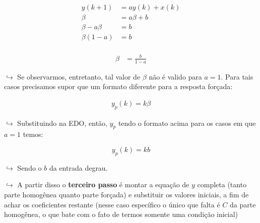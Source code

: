 \documentclass[]{article}
\begin{document}
  \[
  \begin{aligned}
  y(k+1) &= ay(k) + x(k) \\ 
  \beta &= a \beta + b  \\ 
  \beta - a \beta &= b \\ 
  \beta(1 - a) &= b \\ 
  \end{aligned}
  \]

  \[
  \begin{align}
  \beta&= \frac{b}{1-a}
  \end{align}
  \]

  \(\hookrightarrow\) Se observarmos, entretanto, tal valor de \(\beta\)
  não é valido para \(a = 1\). Para tais casos precisamos supor que um
  formato diferente para a resposta forçada:

  \[
  \begin{align}
  y_p(k) = k\beta
  \end{align}
  \]

  \(\hookrightarrow\) Substituindo na EDO, então, \(y_p\) tendo o formato
  acima para os casos em que \(a = 1\) temos:

  \[
  y_p(k) = kb
  \]

  \(\hookrightarrow\) Sendo o \(b\) da entrada degrau.

  \(\hookrightarrow\) A partir disso o \textbf{terceiro passo} é montar a
  equação de \(y\) completa (tanto parte homogênea quanto parte forçada) e
  substituir os valores iniciais, a fim de achar os coeficientes restante
  (nesse caso específico o único que falta é \(C\) da parte homogênea, o
  que bate com o fato de termos somente uma condição inicial)
\end{document}
